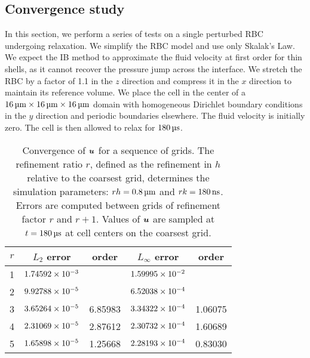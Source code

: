 \subsection{Convergence study}

In this section, we perform a series of tests on a single perturbed RBC undergoing
relaxation. We simplify the RBC model and use only Skalak's Law. We expect the IB method
to approximate the fluid velocity at first order for thin shells, as it cannot recover
the pressure jump across the interface. We stretch the RBC by a factor of 1.1 in the $z$
direction and compress it in the $x$ direction to maintain its reference volume. We place
the cell in the center of a $16\um\times16\um\times16\um$ domain with homogeneous
Dirichlet boundary conditions in the $y$ direction and periodic boundaries elsewhere. The
fluid velocity is initially zero. The cell is then allowed to relax for $180\us$.

\begin{table}[t!]
    \centering
    \caption[Convergence of fluid velocities for relaxing RBC test]{%
Convergence of $\boldsymbol{u}$ for a sequence of grids. The refinement ratio $r$, defined as the
refinement in $h$ relative to the coarsest grid, determines the simulation parameters:
$rh = 0.8\um$ and $r\timestep = 180\ns$. Errors are computed between grids of refinement
factor $r$ and $r+1$. Values of $\boldsymbol{u}$ are sampled at $t = 180\us$ at cell centers on the
coarsest grid.
    }\label{tab:u-rbc-conv}
    \begingroup
    \setlength{\tabcolsep}{9pt}
    \renewcommand{\arraystretch}{1.5}
    \begin{tabular}{c|cc|cc}
                                                                                     \toprule
        $r$ & $L_2$ error            & order   & $L_\infty$ error       & order   \\ \midrule
        1   & ${1.74592}\times 10^{-3}$ &         & ${1.59995}\times 10^{-2}$ &         \\
        2   & ${9.92788}\times 10^{-5}$ &         & ${6.52038}\times 10^{-4}$ &         \\
        3   & ${3.65264}\times 10^{-5}$ & 6.85983 & ${3.34322}\times 10^{-4}$ & 1.06075 \\
        4   & ${2.31069}\times 10^{-5}$ & 2.87612 & ${2.30732}\times 10^{-4}$ & 1.60689 \\
        5   & ${1.65898}\times 10^{-5}$ & 1.25668 & ${2.28193}\times 10^{-4}$ & 0.83030 \\ \bottomrule
    \end{tabular}
    \endgroup
\end{table}

